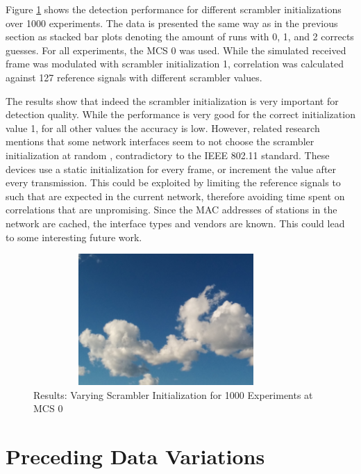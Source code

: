 Figure \ref{fig:vary_scrambler} shows the detection performance for different scrambler initializations over 1000 experiments. The data is presented the same way as in the previous section as stacked bar plots denoting the amount of runs with 0, 1, and 2 corrects guesses. For all experiments, the \gls{MCS} 0 was used. While the simulated received frame was modulated with scrambler initialization 1, correlation was calculated against 127 reference signals with different scrambler values.

The results show that indeed the scrambler initialization is very important for detection quality. While the performance is very good for the correct initialization value 1, for all other values the accuracy is low. However, related research mentions that some network interfaces seem to not choose the scrambler initialization at random \cite{NEEDED}, contradictory to the IEEE 802.11 standard. These devices use a static initialization for every frame, or increment the value after every transmission. This could be exploited by limiting the reference signals to such that are expected in the current network, therefore avoiding time spent on correlations that are unpromising. Since the MAC addresses of stations in the network are cached, the interface types and vendors are known. This could lead to some interesting future work.

\begin{figure}[H]
	\centering
	\includegraphics[width=0.9\textwidth,height=5cm]{gfx/images/stock-clouds}
	\caption[Results: Varying Scrambler Initialization for 1000 Experiments]{Results: Varying Scrambler Initialization for 1000 Experiments at MCS 0}
	\label{fig:vary_scrambler}
\end{figure}



\section{Preceding Data Variations}\label{sec:ex-destination}


